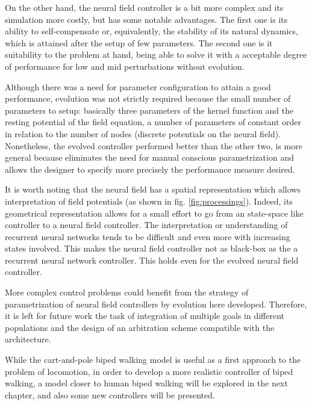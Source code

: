 On the other hand, the neural field controller is a bit more complex
and its simulation more costly, but has some notable advantages. The
first one is its ability to self-compensate or, equivalently, the
stability of its natural dynamics, which is attained after the setup
of few parameters. The second one is it suitability to the problem at
hand, being able to solve it with a acceptable degree of performance
for low and mid perturbations without evolution.

Although there was a need for parameter configuration to attain a good
performance, evolution was not strictly required because the small
number of parameters to setup: basically three parameters of the
kernel function and the resting potential of the field equation, a
number of parameters of constant order in relation to the number of
nodes (discrete potentials on the neural field). Nonetheless, the
evolved controller performed better than the other two, is more
general because eliminates the need for manual conscious
parametrization and allows the designer to specify more precisely the
performance measure desired.

It is worth noting that the neural field has a spatial representation
which allows interpretation of field potentials (as shown in
fig. \ref{fig:processings}). Indeed, its geometrical representation
allows for a small effort to go from an state-space like controller to
a neural field controller. The interpretation or understanding of
recurrent neural networks tends to be difficult and even more with
increasing states involved. This makes the neural field controller not
as black-box as the a recurrent neural network controller. This holds
even for the evolved neural field controller.

More complex control problems could benefit from the strategy of
parametrization of neural field controllers by evolution here
developed. Therefore, it is left for future work the task of
integration of multiple goals in different populations and the design
of an arbitration scheme compatible with the architecture.

While the cart-and-pole biped walking model is useful as a first
approach to the problem of locomotion, in order to develop a more
realistic controller of biped walking, a model closer to human biped
walking will be explored in the next chapter, and also some new
controllers will be presented.








